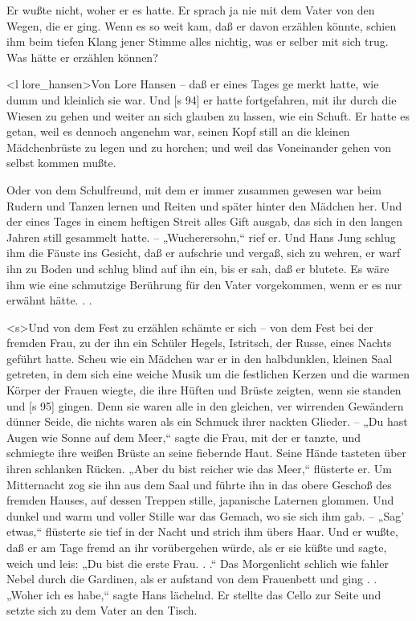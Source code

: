 Er wußte nicht, woher er es hatte. Er sprach
ja nie mit dem Vater von den Wegen, die er ging.
Wenn es so weit kam, daß er davon erzählen könnte,
schien ihm beim tiefen Klang jener Stimme alles
nichtig, was er selber mit sich trug. Was hätte er
erzählen können?

<l lore_hansen>Von Lore Hansen – daß er eines Tages ge­
merkt hatte, wie dumm und kleinlich sie war. Und
[s 94]
er hatte fortgefahren, mit ihr durch die Wiesen zu
gehen und weiter an sich glauben zu lassen, wie ein
Schuft. Er hatte es getan, weil es dennoch angenehm
war, seinen Kopf still an die kleinen Mädchenbrüste
zu legen und zu horchen; und weil das Voneinander­
gehen von selbst kommen mußte.

Oder von dem Schulfreund, mit dem er immer
zusammen gewesen war beim Rudern und Tanzen­
lernen und Reiten und später hinter den Mädchen
her. Und der eines Tages in einem heftigen Streit
alles Gift ausgab, das sich in den langen Jahren still
gesammelt hatte. – „Wucherersohn,“ rief er. Und
Hans Jung schlug ihm die Fäuste ins Gesicht, daß
er aufschrie und vergaß, sich zu wehren, er warf ihn
zu Boden und schlug blind auf ihn ein, bis er sah,
daß er blutete. Es wäre ihm wie eine schmutzige
Berührung für den Vater vorgekommen, wenn er es
nur erwähnt hätte. . .

<s>Und von dem Fest zu erzählen schämte er
sich – von dem Fest bei der fremden Frau, zu der
ihn ein Schüler Hegels, Istritsch, der Russe, eines
Nachts geführt hatte. Scheu wie ein Mädchen war
er in den halbdunklen, kleinen Saal getreten, in dem
sich eine weiche Musik um die festlichen Kerzen
und die warmen Körper der Frauen wiegte, die ihre
Hüften und Brüste zeigten, wenn sie standen und
[s 95]
gingen. Denn sie waren alle in den gleichen, ver­
wirrenden Gewändern dünner Seide, die nichts waren
als ein Schmuck ihrer nackten Glieder. – „Du hast
Augen wie Sonne auf dem Meer,“ sagte die Frau,
mit der er tanzte, und schmiegte ihre weißen Brüste
an seine fiebernde Haut. Seine Hände tasteten
über ihren schlanken Rücken. „Aber du bist reicher
wie das Meer,“ flüsterte er. Um Mitternacht zog
sie ihn aus dem Saal und führte ihn in das obere
Geschoß des fremden Hauses, auf dessen Treppen
stille, japanische Laternen glommen. Und dunkel
und warm und voller Stille war das Gemach, wo
sie sich ihm gab. – „Sag' etwas,“ flüsterte sie tief
in der Nacht und strich ihm übers Haar. Und er
wußte, daß er am Tage fremd an ihr vorübergehen
würde, als er sie küßte und sagte, weich und leis:
„Du bist die erste Frau. . .“ Das Morgenlicht schlich
wie fahler Nebel durch die Gardinen, als er aufstand
von dem Frauenbett und ging . . „Woher ich es
habe,“ sagte Hans lächelnd. Er stellte das Cello
zur Seite und setzte sich zu dem Vater an den Tisch.

